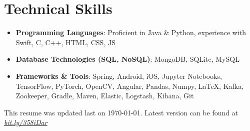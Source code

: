 \documentclass[letterpaper,11pt]{article}
\newcommand{\resumeSubHeadingListStart}{\begin{itemize}[leftmargin=*]}
\newcommand{\resumeSubHeadingListEnd}{\end{itemize}}
\begin{document}
	\section{Technical Skills}
	\resumeSubHeadingListStart
	\item{
		\textbf{Programming Languages}{: Proficient in Java \& Python, experience with Swift, C, C++, HTML, CSS, JS}}
	\vspace{-8pt}
	\item{
		\textbf{Database Technologies (SQL, NoSQL)}{: MongoDB, SQLite, MySQL}}
	\vspace{-8pt}
	\item{
		\textbf{Frameworks \& Tools}{: Spring, Android, iOS, Jupyter Notebooks, TensorFlow, PyTorch, OpenCV, Angular, Pandas, Numpy, \LaTeX, Kafka, Zookeeper, Gradle, Maven, Elastic, Logstash, Kibana, Git}}
	\resumeSubHeadingListEnd
	
	\begin{center}
		\small This resume was updated last on \today. Latest version can be found at \href{http://bit.ly/358iDar}{\textit{bit.ly/358iDar}}
	\end{center}
	
	
\end{document}
